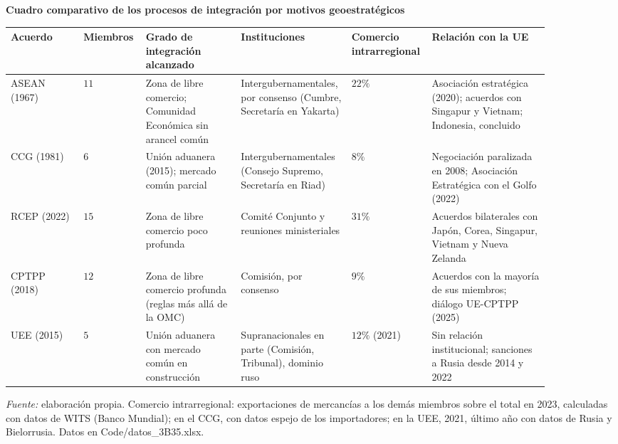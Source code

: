 \documentclass[10pt,a4paper]{article}
\begin{document}
\begin{center}
\textbf{Cuadro comparativo de los procesos de integración por motivos geoestratégicos}\par\medskip
{\footnotesize\renewcommand{\arraystretch}{1.3}
\begin{tabular}{|p{0.13\linewidth}|p{0.11\linewidth}|p{0.17\linewidth}|p{0.17\linewidth}|p{0.09\linewidth}|p{0.21\linewidth}|}
\hline
\raggedright\textbf{Acuerdo} & \raggedright\textbf{Miembros} & \raggedright\textbf{Grado de integración alcanzado} & \raggedright\textbf{Instituciones} & \raggedright\textbf{Comercio intrarre\-gional} & \raggedright\textbf{Relación con la UE}\tabularnewline
\hline
\raggedright ASEAN (1967) & \raggedright $11$ & \raggedright Zona de libre comercio; Comunidad Económica sin arancel común & \raggedright Intergubernamentales, por consenso (Cumbre, Secretaría en Yakarta) & \raggedright $22\%$ & \raggedright Asociación estratégica (2020); acuerdos con Singapur y Vietnam; Indonesia, concluido\tabularnewline
\hline
\raggedright CCG (1981) & \raggedright $6$ & \raggedright Unión aduanera (2015); mercado común parcial & \raggedright Intergubernamentales (Consejo Supremo, Secretaría en Riad) & \raggedright $8\%$ & \raggedright Negociación paralizada en 2008; Asociación Estratégica con el Golfo (2022)\tabularnewline
\hline
\raggedright RCEP (2022) & \raggedright $15$ & \raggedright Zona de libre comercio poco profunda & \raggedright Comité Conjunto y reuniones ministeriales & \raggedright $31\%$ & \raggedright Acuerdos bilaterales con Japón, Corea, Singapur, Vietnam y Nueva Zelanda\tabularnewline
\hline
\raggedright CPTPP (2018) & \raggedright $12$ & \raggedright Zona de libre comercio profunda (reglas más allá de la OMC) & \raggedright Comisión, por consenso & \raggedright $9\%$ & \raggedright Acuerdos con la mayoría de sus miembros; diálogo UE-CPTPP (2025)\tabularnewline
\hline
\raggedright UEE (2015) & \raggedright $5$ & \raggedright Unión aduanera con mercado común en construcción & \raggedright Supranacionales en parte (Comisión, Tribunal), dominio ruso & \raggedright $12\%$ (2021) & \raggedright Sin relación institucional; sanciones a Rusia desde 2014 y 2022\tabularnewline
\hline
\end{tabular}}\par\smallskip
{\footnotesize\textit{Fuente:} elaboración propia. Comercio intrarregional: exportaciones de mercancías a los demás miembros sobre el total en 2023, calculadas con datos de WITS (Banco Mundial); en el CCG, con datos espejo de los importadores; en la UEE, 2021, último año con datos de Rusia y Bielorrusia. Datos en Code/datos\_3B35.xlsx.}
\end{center}
\end{document}
